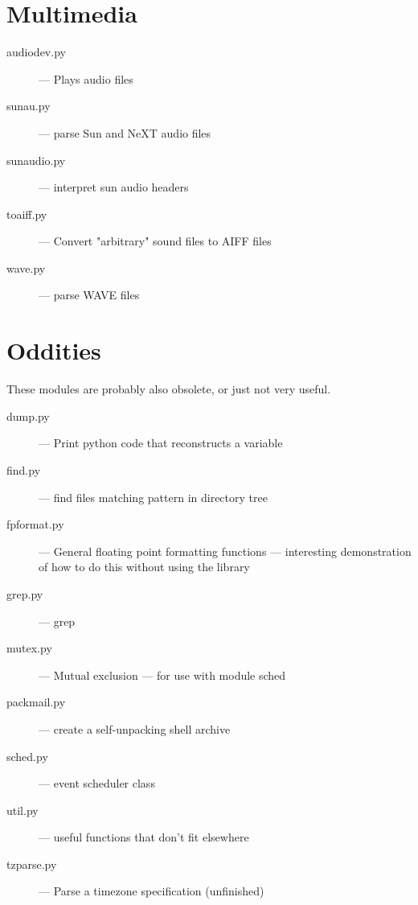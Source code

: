 \section{Multimedia}

\begin{description}
\item[audiodev.py]
--- Plays audio files

\item[sunau.py]
--- parse Sun and NeXT audio files

\item[sunaudio.py]
--- interpret sun audio headers

\item[toaiff.py]
--- Convert "arbitrary" sound files to AIFF files

\item[wave.py]
--- parse WAVE files
\end{description}


\section{Oddities}

These modules are probably also obsolete, or just not very useful.

\begin{description}
\item[dump.py]
--- Print python code that reconstructs a variable

\item[find.py]
--- find files matching pattern in directory tree

\item[fpformat.py]
--- General floating point formatting functions ---
interesting demonstration of how to do this without using the \C{}
library

\item[grep.py]
--- grep

\item[mutex.py]
--- Mutual exclusion --- for use with module sched

\item[packmail.py]
--- create a self-unpacking \UNIX{} shell archive

\item[sched.py]
--- event scheduler class

\item[util.py]
--- useful functions that don't fit elsewhere

\item[tzparse.py]
--- Parse a timezone specification (unfinished)
\end{description}


